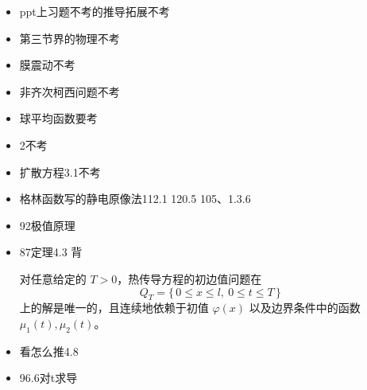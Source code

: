 \begin{itemize}
  \item ppt上习题不考的推导拓展不考
  \item 第三节界的物理不考
  \item 膜震动不考
  \item 非齐次柯西问题不考
  \item 球平均函数要考
  \item 2不考
  \item 扩散方程3.1不考
  \item 格林函数写的静电原像法112.1 120.5 105、1.3.6
  \item 92极值原理
  \item 87定理4.3 背
  \begin{theorem}[4.3]
对任意给定的 $T>0$，热传导方程的初边值问题在
\[
Q_T=\{\,0\le x\le l,\ 0\le t\le T\,\}
\]
上的解是唯一的，且连续地依赖于初值 $\varphi(x)$ 以及边界条件中的函数 $\mu_1(t),\mu_2(t)$。
\end{theorem}
  \item 看怎么推4.8
  \item 96.6对t求导
\end{itemize}